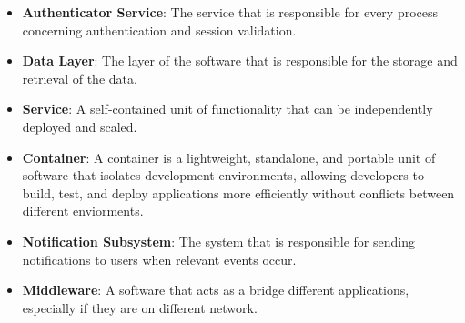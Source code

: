 \begin{itemize}
    \item \textcolor{titleColor}{\textbf{Authenticator Service}\label{def:AuthenticatorService}}: The service that is responsible for every process concerning authentication and session validation.
    \item \textcolor{titleColor}{\textbf{Data Layer}\label{def:DataLayer}}: The layer of the software that is responsible for the storage and retrieval of the data.
    \item \textcolor{titleColor}{\textbf{Service}\label{def:Service}}: A self-contained unit of functionality that can be independently deployed and scaled.
    \item \textcolor{titleColor}{\textbf{Container}\label{def:Container}}: A container is a lightweight, standalone, and portable unit of software that isolates development environments, allowing developers to build, test, and deploy applications more efficiently without conflicts between different enviorments.
    \item \textcolor{titleColor}{\textbf{Notification Subsystem}\label{def:NotificationSubsystem}}: The system that is responsible for sending notifications to users when relevant events occur.
    \item \textcolor{titleColor}{\textbf{Middleware}\label{def:Middleware}}: A software that acts as a bridge different applications, especially if they are on different network.
\end{itemize}

